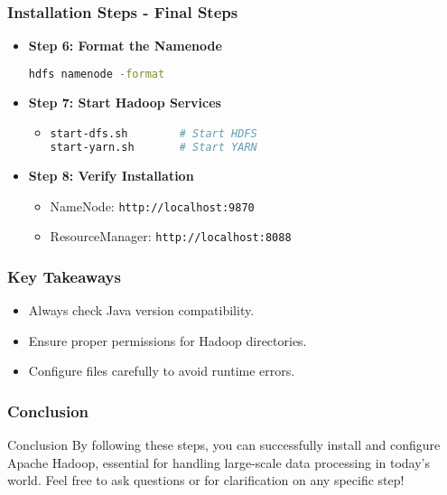\documentclass[aspectratio=169]{beamer}
\begin{document}
\begin{frame}[fragile]
    \frametitle{Installation Steps - Final Steps}
    \begin{itemize}
        \item \textbf{Step 6: Format the Namenode}
        \begin{lstlisting}[language=bash]
hdfs namenode -format
        \end{lstlisting}
        \item \textbf{Step 7: Start Hadoop Services}
        \begin{itemize}
            \item \begin{lstlisting}[language=bash]
start-dfs.sh        # Start HDFS
start-yarn.sh       # Start YARN
            \end{lstlisting}
        \end{itemize}
        \item \textbf{Step 8: Verify Installation}
        \begin{itemize}
            \item NameNode: \texttt{http://localhost:9870}
            \item ResourceManager: \texttt{http://localhost:8088}
        \end{itemize}
    \end{itemize}
\end{frame}

\begin{frame}[fragile]
    \frametitle{Key Takeaways}
    \begin{itemize}
        \item Always check Java version compatibility.
        \item Ensure proper permissions for Hadoop directories.
        \item Configure files carefully to avoid runtime errors.
    \end{itemize}
\end{frame}

\begin{frame}[fragile]
    \frametitle{Conclusion}
    \begin{block}{Conclusion}
        By following these steps, you can successfully install and configure Apache Hadoop, essential for handling large-scale data processing in today's world. Feel free to ask questions or for clarification on any specific step!
    \end{block}
\end{frame}
\end{document}
